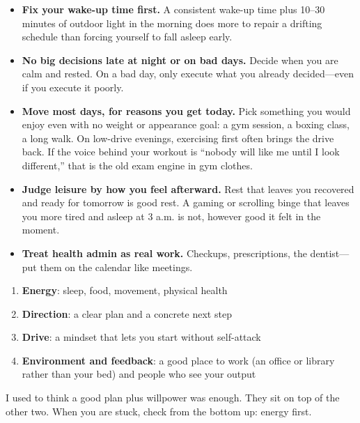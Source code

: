 \documentclass[11pt,a4paper]{article}
\begin{document}
\begin{itemize}
    \item \textbf{Fix your wake-up time first.} A consistent wake-up time plus 10--30 minutes of outdoor light in the morning does more to repair a drifting schedule than forcing yourself to fall asleep early.
    \item \textbf{No big decisions late at night or on bad days.} Decide when you are calm and rested. On a bad day, only execute what you already decided---even if you execute it poorly.
    \item \textbf{Move most days, for reasons you get today.} Pick something you would enjoy even with no weight or appearance goal: a gym session, a boxing class, a long walk. On low-drive evenings, exercising first often brings the drive back. If the voice behind your workout is ``nobody will like me until I look different,'' that is the old exam engine in gym clothes.
    \item \textbf{Judge leisure by how you feel afterward.} Rest that leaves you recovered and ready for tomorrow is good rest. A gaming or scrolling binge that leaves you more tired and asleep at 3 a.m. is not, however good it felt in the moment.
    \item \textbf{Treat health admin as real work.} Checkups, prescriptions, the dentist---put them on the calendar like meetings.
\end{itemize}

\begin{tcolorbox}[colback=green!5,colframe=green!50,title={The Four Foundations of a Good Working State}]
\begin{enumerate}[leftmargin=1.5em]
    \item \textbf{Energy}: sleep, food, movement, physical health
    \item \textbf{Direction}: a clear plan and a concrete next step
    \item \textbf{Drive}: a mindset that lets you start without self-attack
    \item \textbf{Environment and feedback}: a good place to work (an office or library rather than your bed) and people who see your output
\end{enumerate}
I used to think a good plan plus willpower was enough. They sit on top of the other two. When you are stuck, check from the bottom up: energy first.
\end{tcolorbox}
\end{document}
